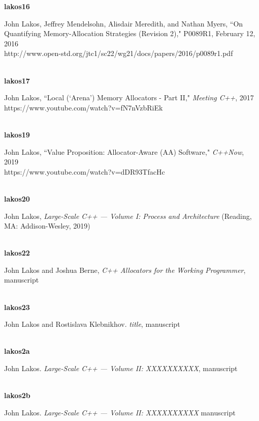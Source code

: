 \noindent\textbf{lakos16}\\
\hspace*{2em}\parbox[t]{\textwidth}{John Lakos, Jeffrey Mendelsohn, Alisdair Meredith, and Nathan Myers, ``On Quantifying Memory-Allocation Strategies (Revision 2),"  P0089R1, February 12, 2016\\
http://www.open-std.org/jtc1/sc22/wg21/docs/papers/2016/p0089r1.pdf}\\

\noindent\textbf{lakos17}\\
\hspace*{2em}\parbox[t]{\textwidth}{John Lakos, ``Local (`Arena') Memory Allocators - Part II," \textit{Meeting C++}, 2017 \\
https://www.youtube.com/watch?v=fN7nVzbRiEk}\\

\noindent\textbf{lakos19}\\
\hspace*{2em}\parbox[t]{\textwidth}{John Lakos, ``Value Proposition: Allocator-Aware (AA) Software," \textit{C++Now}, 2019\\
https://www.youtube.com/watch?v=dDR93TfacHc}\\

\noindent\textbf{lakos20}\\
\hspace*{2em}\parbox[t]{\textwidth}{John Lakos, \textit{Large-Scale C++ --- Volume I: Process and Architecture} (Reading, MA: Addison-Wesley, 2019)}\\

\noindent\textbf{lakos22}\\
\hspace*{2em}\parbox[t]{\textwidth}{John Lakos and Joshua Berne, \textit{C++ Allocators for the Working Programmer}, manuscript} \\

\noindent\textbf{lakos23}\\
\hspace*{2em}\parbox[t]{\textwidth}{John Lakos and Rostislava Klebnikhov. \textit{title}, manuscript} \\

\noindent\textbf{lakos2a}\\
\hspace*{2em}\parbox[t]{\textwidth}{John Lakos. \textit{Large-Scale C++ --- Volume II: XXXXXXXXXX}, manuscript} \\

\noindent\textbf{lakos2b}\\
\hspace*{2em}\parbox[t]{\textwidth}{John Lakos. \textit{Large-Scale C++ --- Volume II: XXXXXXXXXX} manuscript} \\

